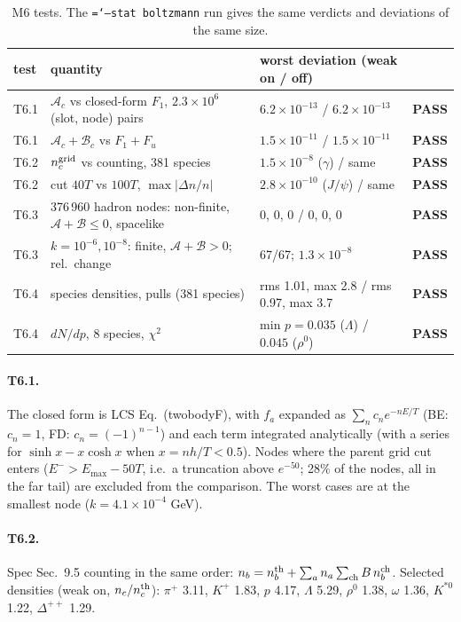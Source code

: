 \documentclass[11pt,a4paper]{article}
\newcommand{\pass}{\textcolor{green!45!black}{\textbf{PASS}}}
\newcommand{\code}[1]{\texttt{\hyphenchar\font=`\-#1}}
\begin{document}
\begin{table}[H]
\centering\footnotesize
\begin{tabular}{llll}
\toprule
test & quantity & worst deviation (weak on / off) & \\
\midrule
T6.1 & $\mathcal A_c$ vs closed-form $F_1$, $2.3\times10^6$ (slot, node) pairs & $6.2\times10^{-13}$ / $6.2\times10^{-13}$ & \pass\\
T6.1 & $\mathcal A_c+\mathcal B_c$ vs $F_1+F_u$ & $1.5\times10^{-11}$ / $1.5\times10^{-11}$ & \pass\\
T6.2 & $n_c^{\rm grid}$ vs counting, 381 species & $1.5\times10^{-8}$ ($\gamma$) / same & \pass\\
T6.2 & cut $40T$ vs $100T$, $\max|\Delta n/n|$ & $2.8\times10^{-10}$ ($J/\psi$) / same & \pass\\
T6.3 & 376\,960 hadron nodes: non-finite, $\mathcal A+\mathcal B\le0$, spacelike & 0, 0, 0 / 0, 0, 0 & \pass\\
T6.3 & $k=10^{-6},10^{-8}$: finite, $\mathcal A+\mathcal B>0$; rel.\ change & 67/67; $1.3\times10^{-8}$ & \pass\\
T6.4 & species densities, pulls (381 species) & rms 1.01, max 2.8 / rms 0.97, max 3.7 & \pass\\
T6.4 & $dN/dp$, 8 species, $\chi^2$ & min $p=0.035$ ($\Lambda$) / $0.045$ ($\rho^0$) & \pass\\
\bottomrule
\end{tabular}
\caption{M6 tests. The \code{--stat boltzmann} run gives the same verdicts and deviations of the
same size.}
\end{table}

\paragraph{T6.1.} The closed form is LCS Eq.~(twobodyF), with $f_a$ expanded as
$\sum_nc_ne^{-nE/T}$ (BE: $c_n=1$, FD: $c_n=(-1)^{n-1}$) and each term integrated analytically
(with a series for $\sinh x-x\cosh x$ when $x=nh/T<0.5$). Nodes where the parent grid cut enters
($E^->E_{\max}-50T$, i.e.\ a truncation above $e^{-50}$; 28\% of the nodes, all in the far tail)
are excluded from the comparison. The worst cases are at the smallest node ($k=4.1\times10^{-4}$
GeV).

\paragraph{T6.2.} Spec Sec.~9.5 counting in the same order:
$n_b=n_b^{\rm th}+\sum_an_a\sum_{\rm ch}B\,n_b^{\rm ch}$. Selected densities (weak on, $n_c/n_c^{\rm th}$):
$\pi^+$ 3.11, $K^+$ 1.83, $p$ 4.17, $\Lambda$ 5.29, $\rho^0$ 1.38, $\omega$ 1.36, $K^{*0}$ 1.22,
$\Delta^{++}$ 1.29.
\end{document}

